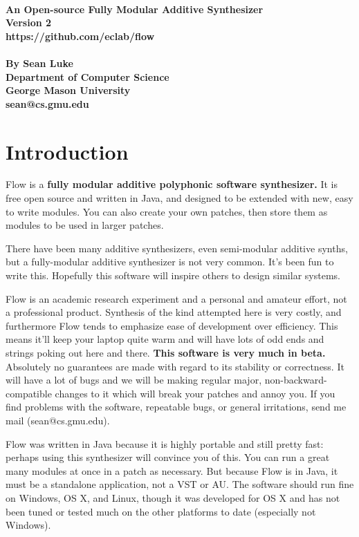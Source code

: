 \documentclass{article}
\newcommand\name{Flow}
\begin{document}
\noindent {\Huge\bf {\name}}\\[0.5em]
{\large \bf An Open-source Fully Modular Additive Synthesizer\\[0.2em]
Version 2\\[0.2em]
https://github.com/eclab/flow\\\\[0.2em]
By Sean Luke\\[0.2em]
Department of Computer Science\\[0.25em]
George Mason University\\[0.2em]
sean@cs.gmu.edu}

\vspace{1em}
\tableofcontents

\clearpage

\section{Introduction}

{\name} is a {\bf fully modular additive polyphonic software synthesizer.}  It is free open source and written in Java, and designed to be extended with new, easy to write modules.  You can also create your own patches, then store them as modules to be used in larger patches. 

There have been many additive synthesizers, even semi-modular additive synths, but a fully-modular additive synthesizer is not very common.   It's been fun to write this.  Hopefully this software will inspire others to design similar systems.

{\name} is an academic research experiment and a personal and amateur effort, not a professional product.  Synthesis of the kind attempted here is very costly, and furthermore {\name} tends to emphasize ease of development over efficiency.  This means it'll keep your laptop quite warm and will have lots of odd ends and strings poking out here and there.  {\bf This software is very much in beta.} Absolutely no guarantees are made with regard to its stability or correctness.  It will have a lot of bugs and we will be making regular major, non-backward-compatible changes to it which will break your patches and annoy you.  If you find problems with the software, repeatable bugs, or general irritations, send me mail (sean@cs.gmu.edu).

{\name} was written in Java because it is highly portable and still pretty fast: perhaps using this synthesizer will convince you of this.  You can run a great many modules at once in a patch as necessary.  But because {\name} is in Java, it must be a standalone application, not a VST or AU.  The software should run fine on Windows, OS X, and Linux, though it was developed for OS X and has not been tuned or tested much on the other platforms to date (especially not Windows).
\end{document}
